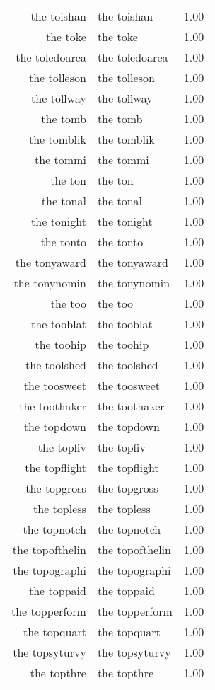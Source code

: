 \begin{table}[ht]
\begin{tabular}{rlr}
  the toishan & the toishan & 1.00 \\ 
  the toke & the toke & 1.00 \\ 
  the toledoarea & the toledoarea & 1.00 \\ 
  the tolleson & the tolleson & 1.00 \\ 
  the tollway & the tollway & 1.00 \\ 
  the tomb & the tomb & 1.00 \\ 
  the tomblik & the tomblik & 1.00 \\ 
  the tommi & the tommi & 1.00 \\ 
  the ton & the ton & 1.00 \\ 
  the tonal & the tonal & 1.00 \\ 
  the tonight & the tonight & 1.00 \\ 
  the tonto & the tonto & 1.00 \\ 
  the tonyaward & the tonyaward & 1.00 \\ 
  the tonynomin & the tonynomin & 1.00 \\ 
  the too & the too & 1.00 \\ 
  the tooblat & the tooblat & 1.00 \\ 
  the toohip & the toohip & 1.00 \\ 
  the toolshed & the toolshed & 1.00 \\ 
  the toosweet & the toosweet & 1.00 \\ 
  the toothaker & the toothaker & 1.00 \\ 
  the topdown & the topdown & 1.00 \\ 
  the topfiv & the topfiv & 1.00 \\ 
  the topflight & the topflight & 1.00 \\ 
  the topgross & the topgross & 1.00 \\ 
  the topless & the topless & 1.00 \\ 
  the topnotch & the topnotch & 1.00 \\ 
  the topofthelin & the topofthelin & 1.00 \\ 
  the topographi & the topographi & 1.00 \\ 
  the toppaid & the toppaid & 1.00 \\ 
  the topperform & the topperform & 1.00 \\ 
  the topquart & the topquart & 1.00 \\ 
  the topsyturvy & the topsyturvy & 1.00 \\ 
  the topthre & the topthre & 1.00 \\ 

\end{tabular}
\end{table}
